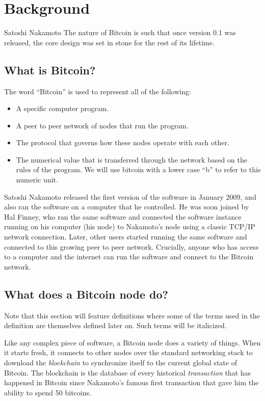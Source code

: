 \chapter{Background}  %
\label{chap:background}

\begin{chapquote}{Satoshi Nakamoto}
The nature of Bitcoin is such that once version 0.1 was released, the core design was set in stone for the rest of its lifetime. 
\end{chapquote}

\section{What is Bitcoin?}
The word ``Bitcoin'' is used to represent all of the following:
\begin{itemize}
    \item A specific computer program.
    \item A peer to peer network of nodes that run the program.
    \item The protocol that governs how these nodes operate with each other.
    \item The numerical value that is transferred through the network based on the rules of the program. We will use bitcoin with a lower case ``b'' to refer to this numeric unit.
\end{itemize}

Satoshi Nakamoto released the first version \cite{satoshi_bitcoin_release_0_1_0} of the software in January 2009, and also ran the software on a computer that he controlled. He was soon joined by Hal Finney, who ran the same software and connected the software instance running on his computer (his node) to Nakamoto's node using a classic TCP/IP network connection. Later, other users started running the same software and connected to this growing peer to peer network. Crucially, anyone who has access to a computer and the internet can run the software and connect to the Bitcoin network. 

\section{What does a Bitcoin node do?}
Note that this section will feature definitions where some of the terms used in the definition are themselves defined later on. Such terms will be italicized. 

Like any complex piece of software, a Bitcoin node does a variety of things. When it starts fresh, it connects to other nodes over the standard networking stack to download the \textit{blockchain} to synchronize itself to the current global state of Bitcoin. The blockchain is the database of every historical \textit{transaction} that has happened in Bitcoin since Nakamoto's famous first transaction that gave him the ability to spend 50 bitcoins. 

